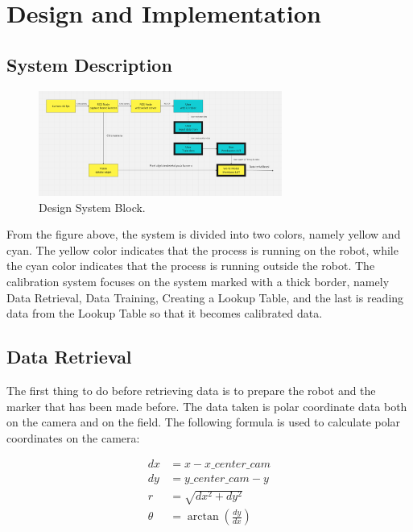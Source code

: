 \section{Design and Implementation}
\label{sec:desaindanimplementasi}

\subsection{System Description}
\label{sec:deskripsisistem}

\begin{figure}[ht]
  \centering
  \includegraphics[width=8cm]{gambar/desain_sistem_vfix.png}
  \caption{Design System Block.}
  \label{fig:webrobot}
\end{figure}

From the figure above, the system is divided into two colors, namely yellow and cyan. The yellow color indicates that the process is running on the robot, while the cyan color indicates that the process is running outside the robot. The calibration system focuses on the system marked with a thick border, namely Data Retrieval, Data Training, Creating a Lookup Table, and the last is reading data from the Lookup Table so that it becomes calibrated data.

\subsection{Data Retrieval
  \label{sec:pengambilandata}}

The first thing to do before retrieving data is to prepare the robot and the marker that has been made before. The data taken is polar coordinate data both on the camera and on the field. The following formula is used to calculate polar coordinates on the camera:

\begin{equation}
  \begin{aligned}
    dx &= x - x\_center\_cam \\ 
    dy &= y\_center\_cam - y \\
    r &= \sqrt{dx^2 + dy^2} \\
    \theta &= \arctan(\frac{dy}{dx})
  \end{aligned}
\end{equation}

